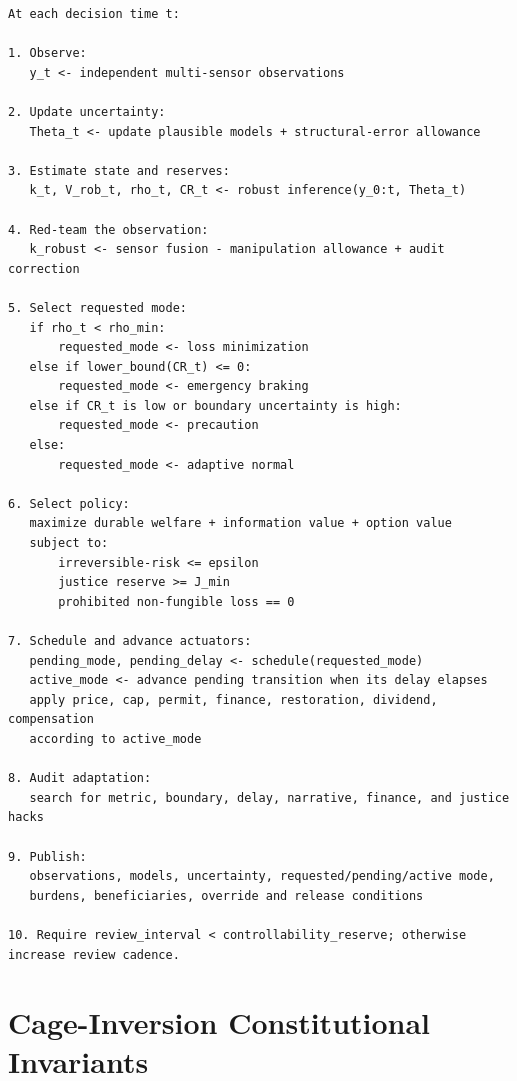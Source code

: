 \documentclass[11pt,a4paper]{article}
\numberwithin{equation}{section}
\theoremstyle{definition}
\theoremstyle{plain}
\theoremstyle{remark}
\begin{document}
\begin{lstlisting}[style=paperpseudo]
At each decision time t:

1. Observe:
   y_t <- independent multi-sensor observations

2. Update uncertainty:
   Theta_t <- update plausible models + structural-error allowance

3. Estimate state and reserves:
   k_t, V_rob_t, rho_t, CR_t <- robust inference(y_0:t, Theta_t)

4. Red-team the observation:
   k_robust <- sensor fusion - manipulation allowance + audit correction

5. Select requested mode:
   if rho_t < rho_min:
       requested_mode <- loss minimization
   else if lower_bound(CR_t) <= 0:
       requested_mode <- emergency braking
   else if CR_t is low or boundary uncertainty is high:
       requested_mode <- precaution
   else:
       requested_mode <- adaptive normal

6. Select policy:
   maximize durable welfare + information value + option value
   subject to:
       irreversible-risk <= epsilon
       justice reserve >= J_min
       prohibited non-fungible loss == 0

7. Schedule and advance actuators:
   pending_mode, pending_delay <- schedule(requested_mode)
   active_mode <- advance pending transition when its delay elapses
   apply price, cap, permit, finance, restoration, dividend, compensation
   according to active_mode

8. Audit adaptation:
   search for metric, boundary, delay, narrative, finance, and justice hacks

9. Publish:
   observations, models, uncertainty, requested/pending/active mode,
   burdens, beneficiaries, override and release conditions

10. Require review_interval < controllability_reserve; otherwise increase review cadence.
\end{lstlisting}

\section{Cage-Inversion Constitutional Invariants}
\end{document}
